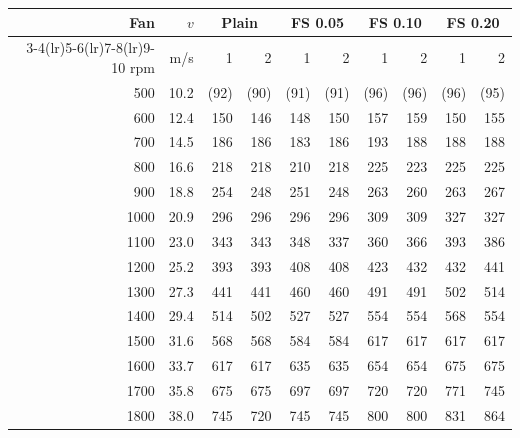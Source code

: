 \begin{tabular}{@{}rr rr rr rr rr@{}}
\toprule
Fan & $v$ & \multicolumn{2}{c}{Plain} & \multicolumn{2}{c}{FS 0.05} & \multicolumn{2}{c}{FS 0.10} & \multicolumn{2}{c}{FS 0.20} \\
\cmidrule(lr){3-4}\cmidrule(lr){5-6}\cmidrule(lr){7-8}\cmidrule(lr){9-10}
rpm & m/s & 1 & 2 & 1 & 2 & 1 & 2 & 1 & 2 \\
\midrule
500 & 10.2 & (92) & (90) & (91) & (91) & (96) & (96) & (96) & (95) \\
600 & 12.4 & 150 & 146 & 148 & 150 & 157 & 159 & 150 & 155 \\
700 & 14.5 & 186 & 186 & 183 & 186 & 193 & 188 & 188 & 188 \\
800 & 16.6 & 218 & 218 & 210 & 218 & 225 & 223 & 225 & 225 \\
900 & 18.8 & 254 & 248 & 251 & 248 & 263 & 260 & 263 & 267 \\
1000 & 20.9 & 296 & 296 & 296 & 296 & 309 & 309 & 327 & 327 \\
1100 & 23.0 & 343 & 343 & 348 & 337 & 360 & 366 & 393 & 386 \\
1200 & 25.2 & 393 & 393 & 408 & 408 & 423 & 432 & 432 & 441 \\
1300 & 27.3 & 441 & 441 & 460 & 460 & 491 & 491 & 502 & 514 \\
1400 & 29.4 & 514 & 502 & 527 & 527 & 554 & 554 & 568 & 554 \\
1500 & 31.6 & 568 & 568 & 584 & 584 & 617 & 617 & 617 & 617 \\
1600 & 33.7 & 617 & 617 & 635 & 635 & 654 & 654 & 675 & 675 \\
1700 & 35.8 & 675 & 675 & 697 & 697 & 720 & 720 & 771 & 745 \\
1800 & 38.0 & 745 & 720 & 745 & 745 & 800 & 800 & 831 & 864 \\
\bottomrule
\end{tabular}
